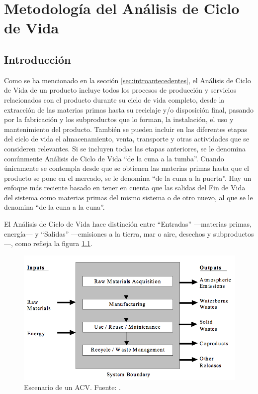 \chapter{Metodología del Análisis de Ciclo de Vida}\label{cap:metodologia_acv}
\section{Introducción}

Como se ha mencionado en la sección \ref{sec:introantecedentes}, el Análisis de Ciclo de Vida de un producto incluye todos los procesos de producción y servicios relacionados con el producto durante su ciclo de vida completo, desde la extracción de las materias primas hasta su reciclaje y/o disposición final, pasando por la fabricación y los subproductos que lo forman, la instalación, el uso y mantenimiento del producto. También se pueden incluir en las diferentes etapas del ciclo de vida el almacenamiento, venta, transporte y otras actividades que se consideren relevantes. Si se incluyen todas las etapas anteriores, se le denomina comúnmente Análisis de Ciclo de Vida ``de la cuna a la tumba''. Cuando únicamente se contempla desde que se obtienen las materias primas hasta que el producto se pone en el mercado, se le denomina ``de la cuna a la puerta''. Hay un enfoque más reciente basado en tener en cuenta que las salidas del Fin de Vida del sistema como materias primas del mismo sistema o de otro nuevo, al que se le denomina ``de la cuna a la cuna''.


El Análisis de Ciclo de Vida hace distinción entre ``Entradas'' —materias primas, energía— y ``Salidas'' —emisiones a la tierra, mar o aire, desechos y subproductos—, como refleja la figura \ref{fig:escenariolca}.

\begin{figure}[!htb]
\centering
\includegraphics[width=12cm]{img/escenariolca.png}
\caption[Escenario de un ACV]{Escenario de un ACV. Fuente: \protect\cite{epa}.}
\label{fig:escenariolca}
\end{figure}

